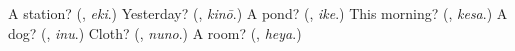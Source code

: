\begin{tcolorbox}[breakable,colback=teal!4,colframe=teal!35!black,title={Before you move on}]
A station? (\textbf{}, \emph{eki}.) Yesterday? (\textbf{}, \emph{kinō}.) A pond? (\textbf{}, \emph{ike}.) This morning? (\textbf{}, \emph{kesa}.) A dog? (\textbf{}, \emph{inu}.) Cloth? (\textbf{}, \emph{nuno}.) A room? (\textbf{}, \emph{heya}.)
\end{tcolorbox}

